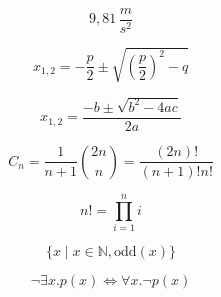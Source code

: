 $$9,81\,\frac{m}{s^2}$$

$$x_{1,2} = - \frac{p}{2} \pm \sqrt{\left(\frac{p}{2}\right)^2 - q}$$

$$x_{1,2} = \frac{-b \pm \sqrt{b^2 - 4ac}}{2a}$$

\begin{equation*}
  C_n = \frac{1}{n+1} {2n \choose n} = \frac{(2n)!}{(n+1)!n!}
\end{equation*}

$$n! = \prod_{i=1}^{n} i$$

$$\{ x \mid x \in \mathds{N}, \mathrm{odd}(x) \}$$

$$\neg\exists x . p(x) \Leftrightarrow \forall x . \neg p(x)$$